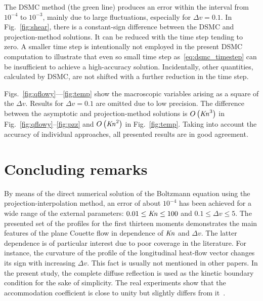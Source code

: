 \documentclass[review]{elsarticle}
\newcommand{\Kn}{\mbox{\textit{Kn}}}
\newcommand{\OO}[1]{O\left(#1\right)}
\begin{document}
The DSMC method (the green line) produces an error within the interval from \(10^{-4}\) to \(10^{-3}\),
mainly due to large fluctuations, especially for \(\Delta{v}=0.1\).
In Fig.~\ref{fig:shear}, there is a constant-sign difference
between the DSMC and projection-method solutions.
It can be reduced with the time step tending to zero.
A smaller time step is intentionally not employed in the present DSMC computation
to illustrate that even so small time step as~\eqref{eq:dsmc_timestep} can be insufficient
to achieve a high-accuracy solution.
Incidentally, other quantities, calculated by DSMC, are not shifted with
a further reduction in the time step.

Figs.~\ref{fig:qflowy}---\ref{fig:temp} show the macroscopic variables
arising as a square of the \(\Delta{v}\).
Results for \(\Delta{v}=0.1\) are omitted due to low precision.
The difference between the asymptotic and projection-method solutions
is \(\OO{\Kn^3}\) in Fig.~\ref{fig:qflowy}--\ref{fig:pzz} and \(\OO{\Kn^2}\) in Fig.~\ref{fig:temp}.
Taking into account the accuracy of individual approaches,
all presented results are in good agreement.

\section{Concluding remarks}

By means of the direct numerical solution of the Boltzmann equation using the projection-interpolation method,
an error of about \(10^{-4}\) has been achieved for a wide range of the external parameters:
\(0.01 \le \Kn \le 100\) and \(0.1 \le \Delta{v} \le 5\).
The presented set of the profiles for the first thirteen moments demonstrates
the main features of the plane Couette flow in dependence of \(\Kn\) and \(\Delta{v}\).
The latter dependence is of particular interest due to poor coverage in the literature.
For instance, the curvature of the profile of the longitudinal heat-flow vector
changes its sign with increasing \(\Delta{v}\).
This fact is usually not mentioned in other papers.
In the present study, the complete diffuse reflection is used as the kinetic boundary condition
for the sake of simplicity. The real experiments show that the accommodation coefficient
is close to unity but slightly differs from it~\citep{Agrawal2008}.
\end{document}
